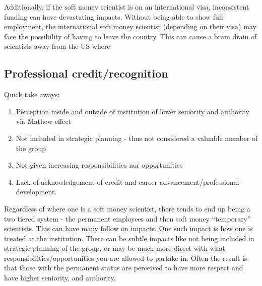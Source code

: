 \documentclass[letterpaper, 12pt]{article}
\begin{document}
Additionally, if the soft money scientist is on an international visa, inconsistent funding can have devastating impacts. Without being able to show full employment, the international soft money scientist (depending on their visa) may face the possibility of having to leave the country. This can cause a brain drain of scientists away from the US where


\subsection{Professional credit/recognition}
\begin{tcolorbox}[enhanced,width=\textwidth,center upper,
    fontupper=\bfseries,sharp corners, colback=CASIIlightgrey, colframe=CASIIdarkgreen]
\textcolor{CASIIorange}{Quick take aways:}
\begin{enumerate}
    \item \textcolor{CASIIdarkindago}{Perception inside and outside of institution of lower seniority and authority via Mathew effect}
    \item \textcolor{CASIIdarkindago}{Not included in strategic planning - thus not considered a valuable member of the group}
    \item \textcolor{CASIIdarkindago}{Not given increasing responsibilities nor opportunities }
    \item \textcolor{CASIIdarkindago}{Lack of acknowledgement of credit and career advancement/professional development.}

\end{enumerate}
\end{tcolorbox}

Regardless of where one is a soft money scientist, there tends to end up being a two tiered system - the permanent employees and then soft money “temporary” scientists. This can have many follow on impacts. One such impact is how one is treated at the institution. There can be subtle impacts like not being included in strategic planning of the group, or may be much more direct with what responsibilities/opportunities you are allowed to partake in. Often the result is that those with the permanent status are perceived to have more respect and have higher seniority, and authority. 
\end{document}
